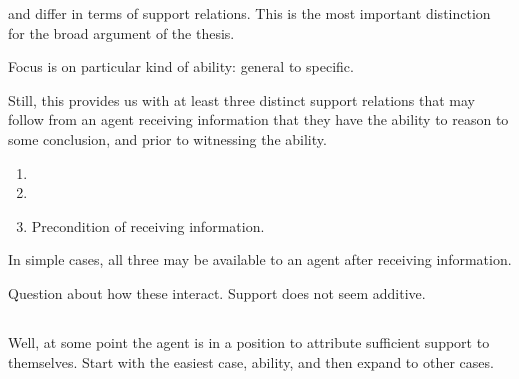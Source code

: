 \begin{note}
  \AR{} and \WR{} differ in terms of support relations.
  This is the most important distinction for the broad argument of the thesis.

  Focus is on particular kind of ability: general to specific.

  Still, this provides us with at least three distinct support relations that may follow from an agent receiving information that they have the ability to reason to some conclusion, and prior to witnessing the ability.
  \begin{enumerate}
  \item \AR{}
  \item \WR{}
  \item Precondition of receiving information.
  \end{enumerate}
  In simple cases, all three may be available to an agent after receiving information.

  Question about how these interact.
  Support does not seem additive.
  
\end{note}

\subsection{\AR{}}
\label{sec:ar}

\begin{note}
  Well, at some point the agent is in a position to attribute sufficient support to themselves.
  Start with the easiest case, ability, and then expand to other cases.
\end{note}

